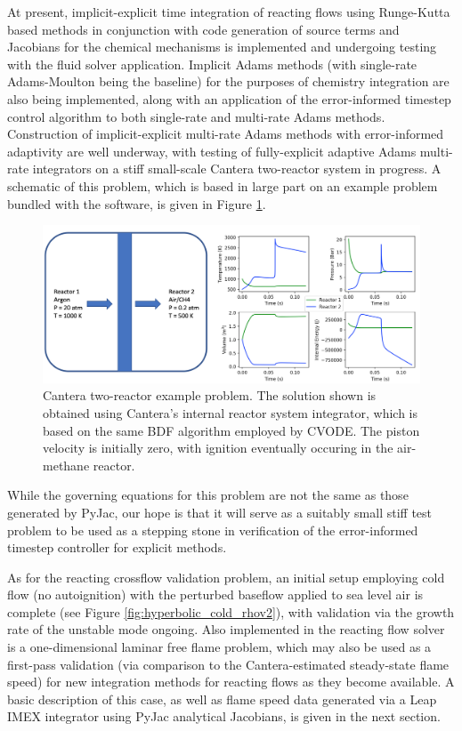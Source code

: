 At present, implicit-explicit time integration of reacting flows using Runge-Kutta
based methods in conjunction with code generation of source terms and Jacobians for
the chemical mechanisms is implemented and undergoing testing with the fluid solver
application. Implicit Adams methods (with single-rate Adams-Moulton being the baseline)
for the purposes of chemistry integration are also being implemented, along with
an application of the error-informed timestep control algorithm to both
single-rate and multi-rate Adams methods. Construction of implicit-explicit multi-rate
Adams methods with error-informed adaptivity are well underway, with testing
of fully-explicit adaptive Adams multi-rate integrators on a stiff small-scale Cantera
\cite{cantera} two-reactor system in progress. A schematic of this problem, which is
based in large part on an example problem bundled with the software, is given in
Figure \ref{fig:cantera_reactors}.
\begin{figure}
\centering
\includegraphics[width=0.8\linewidth,trim=4 4 4 4,clip]{figures/cantera_reactors_soln.png}
\caption{Cantera two-reactor example problem. The solution shown is obtained using
	 Cantera's internal reactor system integrator, which is based on the same
	 BDF algorithm employed by CVODE. The piston velocity is initially zero,
	 with ignition eventually occuring in the air-methane reactor.}
\label{fig:cantera_reactors}
\end{figure}
While the governing equations for this problem are not the same as those generated
by PyJac, our hope is that it will serve as a suitably small stiff test problem to be
used as a stepping stone in verification of the error-informed timestep controller
for explicit methods.

As for the reacting crossflow validation problem, an initial setup employing
cold flow (no autoignition) with the perturbed baseflow applied to sea level air
is complete (see Figure \ref{fig:hyperbolic_cold_rhov2}), with validation via the
growth rate of the unstable mode ongoing. Also implemented in the reacting flow
solver is a one-dimensional laminar free flame problem, which may also be used
as a first-pass validation (via comparison to the Cantera-estimated steady-state
flame speed) for new integration methods for reacting flows as they become available.
A basic description of this case, as well as flame speed data generated via a Leap
IMEX integrator using PyJac analytical Jacobians, is given in the next section.

